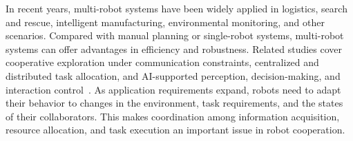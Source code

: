 \documentclass[type=submission,name=IR]{oae}
\begin{document}
In recent years, multi-robot systems have been widely applied in logistics, search and rescue, intelligent manufacturing, environmental monitoring, and other scenarios. Compared with manual planning or single-robot systems, multi-robot systems can offer advantages in efficiency and robustness. Related studies cover cooperative exploration under communication constraints, centralized and distributed task allocation, and AI-supported perception, decision-making, and interaction control~\cite{amigoni_communication_survey,geng_distributed_comparison,chen_ai_industrial,li_embodied_ai,alsharafa_teleoperation}. As application requirements expand, robots need to adapt their behavior to changes in the environment, task requirements, and the states of their collaborators. This makes coordination among information acquisition, resource allocation, and task execution an important issue in robot cooperation.
\end{document}
